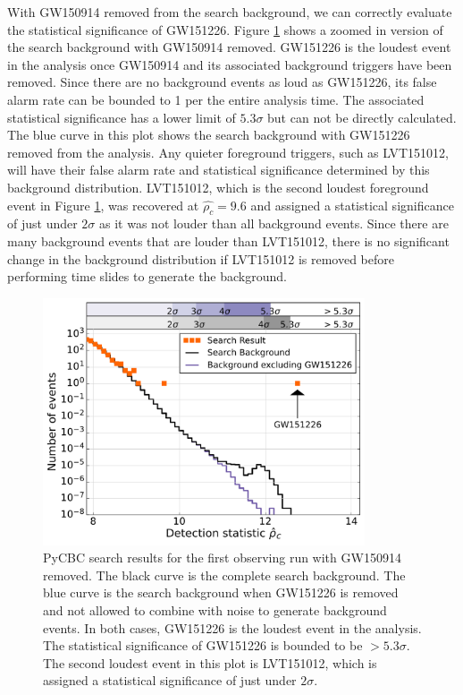 With GW150914 removed from the search background, we can correctly evaluate the 
statistical significance of GW151226. 
Figure \ref{fig:pycbc-hist-gw151226} shows a zoomed in version
of the search background with GW150914 removed. 
GW151226 is the loudest event in the analysis once GW150914 and its associated 
background triggers have been removed. Since there are no background events 
as loud as GW151226, its false alarm rate can be bounded to 1 per the entire 
analysis time. The associated statistical significance has a lower limit of 
$5.3\sigma$ but can not be directly calculated. The blue curve in this plot 
shows the search background with GW151226 removed from the analysis. Any 
quieter foreground triggers, such as LVT151012, will have their false alarm 
rate and statistical significance determined by this background distribution.  
LVT151012, which is the second loudest foreground event in Figure 
\ref{fig:pycbc-hist-gw151226}, was recovered at $\hat{\rho_c} = 9.6$ and 
assigned a statistical significance of just under $2\sigma$ as it was 
not louder than all background events.  Since there are many background 
events that are louder than LVT151012, there is no significant change 
in the background distribution if LVT151012 is removed before performing 
time slides to generate the background. 

\begin{figure}[ht!]%
\includegraphics[width=0.85\textwidth]{figures/O1/pycbc_hist_GW151226}
\caption[PyCBC result histograms for GW151226]{PyCBC search results for the %
         first observing run with GW150914 removed. The black curve is the %
         complete search background. The blue curve is the search background %
         when GW151226 is removed and not allowed to combine with noise to %
         generate background events. In both cases, GW151226 is the loudest %
         event in the analysis. The statistical significance of GW151226 %
         is bounded to be $> 5.3\sigma$. The second loudest event in this %
         plot is LVT151012, which is assigned a statistical significance of %
         just under $2\sigma$.}
\label{fig:pycbc-hist-gw151226}
\end{figure}

